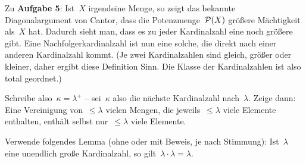 \documentclass{uebblatt}
\begin{document}
Zu \textbf{Aufgabe 5}: Ist~$X$ irgendeine Menge, so zeigt das bekannte
Diagonalargument von Cantor, dass die Potenzmenge~$\P(X)$ größere Mächtigkeit
als~$X$ hat. Dadurch sieht man, dass es zu jeder Kardinalzahl eine noch größere
gibt. Eine Nachfolgerkardinalzahl ist nun eine solche, die direkt nach einer
anderen Kardinalzahl kommt. (Je zwei Kardinalzahlen sind gleich, größer oder
kleiner, daher ergibt diese Definition Sinn. Die Klasse der Kardinalzahlen ist
also total geordnet.)

Schreibe also~$\kappa = \lambda^+$ -- sei~$\kappa$ also die nächste
Kardinalzahl nach~$\lambda$. Zeige dann: Eine Vereinigung von~$\leq
\lambda$ vielen Mengen, die jeweils~$\leq \lambda$ viele Elemente enthalten,
enthält selbst nur~$\leq \lambda$ viele Elemente.

Verwende folgendes Lemma (ohne oder mit Beweis, je nach Stimmung): Ist~$\lambda$ eine unendlich große
Kardinalzahl, so gilt~$\lambda \cdot \lambda = \lambda$.
\end{document}

